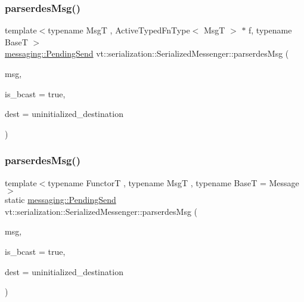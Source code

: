 \mbox{\label{structvt_1_1serialization_1_1_serialized_messenger_a004e1bae5078208d62d432496e0fbf3a}} 
\subsubsection{\texorpdfstring{parserdes\+Msg()}{parserdesMsg()}\hspace{0.1cm}{\footnotesize\ttfamily [1/2]}}
{\footnotesize\ttfamily template$<$typename MsgT , Active\+Typed\+Fn\+Type$<$ Msg\+T $>$ $\ast$ f, typename BaseT $>$ \\
\hyperlink{structvt_1_1messaging_1_1_pending_send}{messaging\+::\+Pending\+Send} vt\+::serialization\+::\+Serialized\+Messenger\+::parserdes\+Msg (\begin{DoxyParamCaption}\item[{MsgT $\ast$}]{msg,  }\item[{bool}]{is\+\_\+bcast = {\ttfamily true},  }\item[{\hyperlink{namespacevt_a866da9d0efc19c0a1ce79e9e492f47e2}{Node\+Type}}]{dest = {\ttfamily uninitialized\+\_\+destination} }\end{DoxyParamCaption})\hspace{0.3cm}{\ttfamily [static]}}

\mbox{\label{structvt_1_1serialization_1_1_serialized_messenger_af32e8f605636b373600457f12f363a51}} 
\subsubsection{\texorpdfstring{parserdes\+Msg()}{parserdesMsg()}\hspace{0.1cm}{\footnotesize\ttfamily [2/2]}}
{\footnotesize\ttfamily template$<$typename FunctorT , typename MsgT , typename BaseT  = Message$>$ \\
static \hyperlink{structvt_1_1messaging_1_1_pending_send}{messaging\+::\+Pending\+Send} vt\+::serialization\+::\+Serialized\+Messenger\+::parserdes\+Msg (\begin{DoxyParamCaption}\item[{MsgT $\ast$}]{msg,  }\item[{bool}]{is\+\_\+bcast = {\ttfamily true},  }\item[{\hyperlink{namespacevt_a866da9d0efc19c0a1ce79e9e492f47e2}{Node\+Type}}]{dest = {\ttfamily uninitialized\+\_\+destination} }\end{DoxyParamCaption})\hspace{0.3cm}{\ttfamily [static]}}

